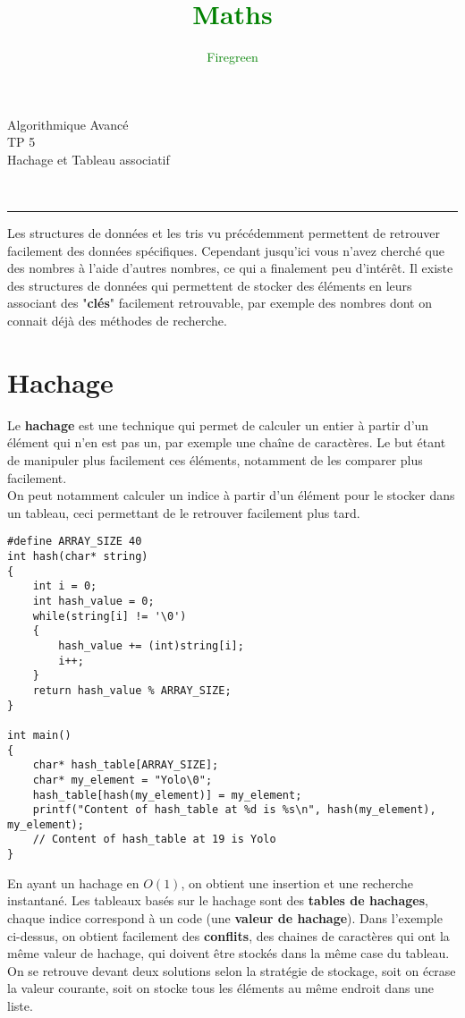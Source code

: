 \documentclass[11pt]{extarticle}
\author{\textcolor{Green}{Firegreen}}
\title{\textcolor{Green}{\textbf{Maths}}}
\begin{document}
\begin{minipage}[t]{0.3\paperwidth}
\begin{flushleft}
\end{flushleft}
\end{minipage}
\begin{minipage}[t]{0.4\paperwidth}
\begin{flushright}
\noindent \Huge{Algorithmique Avancé} \\
\noindent \LARGE{TP 5} \\
\noindent \Large{Hachage et Tableau associatif}
\end{flushright}
\end{minipage}\\
\begin{center}
\rule{\textwidth}{0.2cm}
\end{center}
Les structures de données et les tris vu précédemment permettent de retrouver facilement des données spécifiques. Cependant jusqu'ici vous n'avez cherché que des nombres à l'aide d'autres nombres, ce qui a finalement peu d'intérêt. Il existe des structures de données qui permettent de stocker des éléments en leurs associant des "\textbf{clés}" facilement retrouvable, par exemple des nombres dont on connait déjà des méthodes de recherche.
  
\section{Hachage}
Le \textbf{hachage} est une technique qui permet de calculer un entier à partir d'un élément qui n'en est pas un, par exemple une chaîne de caractères. Le but étant de manipuler plus facilement ces éléments, notamment de les comparer plus facilement.\\
On peut notamment calculer un indice à partir d'un élément pour le stocker dans un tableau, ceci permettant de le retrouver facilement plus tard.\\
\begin{lstlisting}[style=customc, escapechar=@]
#define ARRAY_SIZE 40
int hash(char* string)
{
	int i = 0;
	int hash_value = 0;
	while(string[i] != '\0')
	{
		hash_value += (int)string[i];
		i++;
	}
	return hash_value % ARRAY_SIZE;
}

int main()
{
	char* hash_table[ARRAY_SIZE];
	char* my_element = "Yolo\0";
	hash_table[hash(my_element)] = my_element;
	printf("Content of hash_table at %d is %s\n", hash(my_element), my_element);
	// Content of hash_table at 19 is Yolo
}
\end{lstlisting}
En ayant un hachage en $O(1)$, on obtient une insertion et une recherche instantané. Les tableaux basés sur le hachage sont des \textbf{tables de hachages}, chaque indice correspond à un code (une \textbf{valeur de hachage}). Dans l'exemple ci-dessus, on obtient facilement des \textbf{conflits}, des chaines de caractères qui ont la même valeur de hachage, qui doivent être stockés dans la même case du tableau. On se retrouve devant deux solutions selon la stratégie de stockage, soit on écrase la valeur courante, soit on stocke tous les éléments au même endroit dans une liste.
\end{document}
